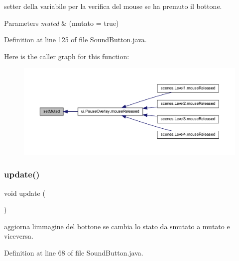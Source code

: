 setter della variabile per la verifica del mouse se ha premuto il bottone. 


\begin{DoxyParams}{Parameters}
{\em muted} & (mutato = true) \\
\hline
\end{DoxyParams}


Definition at line 125 of file Sound\+Button.\+java.

Here is the caller graph for this function\+:\nopagebreak
\begin{figure}[H]
\begin{center}
\leavevmode
\includegraphics[width=350pt]{classui_1_1_sound_button_a9dfe6f9f7337d35cf2e6624259b72134_icgraph}
\end{center}
\end{figure}
\mbox{\label{classui_1_1_sound_button_ac5c54df7ed3b930268c8d7752c101725}} 
\subsubsection{\texorpdfstring{update()}{update()}}
{\footnotesize\ttfamily void update (\begin{DoxyParamCaption}{ }\end{DoxyParamCaption})}



aggiorna l\textquotesingle{}immagine del bottone se cambia lo stato da smutato a mutato e viceversa. 



Definition at line 68 of file Sound\+Button.\+java.

